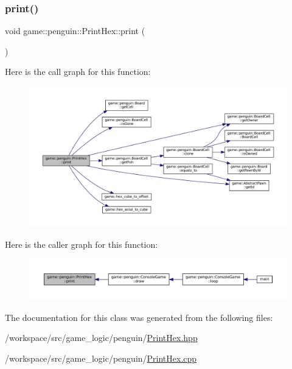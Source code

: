 \subsubsection{\texorpdfstring{print()}{print()}}
{\footnotesize\ttfamily void game\+::penguin\+::\+Print\+Hex\+::print (\begin{DoxyParamCaption}{ }\end{DoxyParamCaption})}

Here is the call graph for this function\+:
\nopagebreak
\begin{figure}[H]
\begin{center}
\leavevmode
\includegraphics[width=350pt]{classgame_1_1penguin_1_1_print_hex_a87a58be4fea97f043e6dbe01a3045c1d_cgraph}
\end{center}
\end{figure}
Here is the caller graph for this function\+:
\nopagebreak
\begin{figure}[H]
\begin{center}
\leavevmode
\includegraphics[width=350pt]{classgame_1_1penguin_1_1_print_hex_a87a58be4fea97f043e6dbe01a3045c1d_icgraph}
\end{center}
\end{figure}


The documentation for this class was generated from the following files\+:\begin{DoxyCompactItemize}
\item 
/workspace/src/game\+\_\+logic/penguin/\hyperlink{_print_hex_8hpp}{Print\+Hex.\+hpp}\item 
/workspace/src/game\+\_\+logic/penguin/\hyperlink{_print_hex_8cpp}{Print\+Hex.\+cpp}\end{DoxyCompactItemize}
